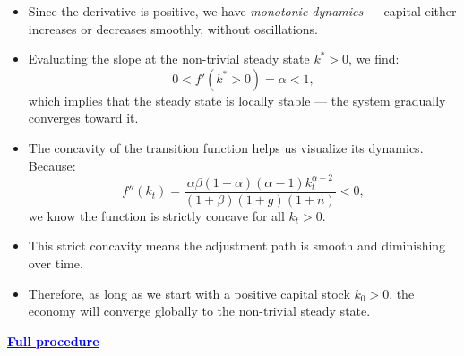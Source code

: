 \documentclass[12pt]{article}
\begin{document}
\begin{itemize}
\item Since the derivative is positive, we have \textit{monotonic dynamics} — capital either increases or decreases smoothly, without oscillations.

\item Evaluating the slope at the non-trivial steady state \( k^* > 0 \), we find:
\[
0 < f'(k^* > 0) = \alpha < 1,
\]
which implies that the steady state is locally stable — the system gradually converges toward it.

\item The concavity of the transition function helps us visualize its dynamics. Because:
\[
f''(k_t) = \frac{\alpha \beta (1 - \alpha)(\alpha - 1) k_t^{\alpha - 2}}{(1 + \beta)(1 + g)(1 + n)} < 0,
\]
we know the function is strictly concave for all \( k_t > 0 \).

\item This strict concavity means the adjustment path is smooth and diminishing over time.

\item Therefore, as long as we start with a positive capital stock \( k_0 > 0 \), the economy will converge globally to the non-trivial steady state.
\end{itemize}

\textcolor{blue}{\textbf{\uline{Full procedure}}}
\end{document}
